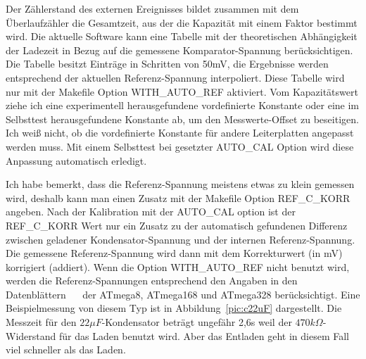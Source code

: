 Der Zählerstand des externen Ereignisses bildet zusammen mit dem Überlaufzähler die Gesamtzeit, aus der die
Kapazität mit einem Faktor bestimmt wird.
Die aktuelle Software kann eine Tabelle mit der theoretischen Abhängigkeit der Ladezeit in Bezug auf die gemessene
Komparator-Spannung berücksichtigen.
Die Tabelle besitzt Einträge in Schritten von 50mV, die Ergebnisse werden entsprechend der aktuellen Referenz-Spannung interpoliert.
Diese Tabelle wird nur mit der Makefile Option WITH\_AUTO\_REF aktiviert.
Vom Kapazitätswert ziehe ich eine experimentell herausgefundene vordefinierte Konstante oder eine im Selbsttest
herausgefundene Konstante ab, um den Messwerte-Offset zu beseitigen.
Ich weiß nicht, ob die vordefinierte Konstante für andere Leiterplatten angepasst werden muss.
Mit einem Selbsttest bei gesetzter AUTO\_CAL Option wird diese Anpassung automatisch erledigt.

Ich habe bemerkt, dass die Referenz-Spannung meistens etwas zu klein gemessen wird,
 deshalb kann man einen Zusatz mit der Makefile Option REF\_C\_KORR angeben.
Nach der Kalibration mit der AUTO\_CAL option ist der REF\_C\_KORR Wert nur ein Zusatz zu der automatisch
gefundenen Differenz zwischen geladener Kondensator-Spannung und der internen Referenz-Spannung.
Die gemessene Referenz-Spannung wird dann mit dem Korrekturwert (in mV) korrigiert (addiert).
Wenn die Option WITH\_AUTO\_REF nicht benutzt wird, werden die Referenz-Spannungen entsprechend den Angaben in den
Datenblättern ~\cite{ATmega8}~\cite{ATmega168} der ATmega8, ATmega168 und ATmega328 berücksichtigt.
Eine Beispielmessung von diesem Typ ist in Abbildung~\ref{pic:c22uF} dargestellt.
Die Messzeit für den \(22 \mu F\)-Kondensator beträgt ungefähr 2,6s weil der \(470k\Omega\)-Widerstand für das Laden benutzt wird.
Aber das Entladen geht in diesem Fall viel schneller als das Laden.

